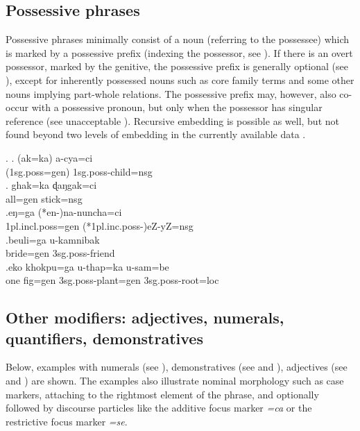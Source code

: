 \subsection{Possessive phrases}\label{str-np-poss}

Possessive phrases minimally consist  of a noun (referring to the possessee) which is marked by a possessive prefix (indexing the possessor, see \Next[a]). If there is an overt possessor, marked by the genitive, the possessive prefix is generally optional (see \Next[b]), except for inherently possessed nouns such as core family terms and some other nouns implying part-whole relations. The possessive prefix may, however, also  co-occur with a possessive pronoun, but only when the possessor has singular reference (see unacceptable \Next[c]). Recursive embedding is possible as well, but not found beyond two levels of embedding in the currently available data \Next[e].

\ex. \ag. (ak=ka)        a-cya=ci\\
({\sc 1sg.poss=gen}) {\sc 1sg.poss-}child{\sc =nsg}\\
 
\bg. ghak=ka    ɖaŋgak=ci\\
all{\sc =gen} stick{\sc =nsg}\\
 
\bg.eŋ=ga              (*en-)na-nuncha=ci\\
{\sc 1pl.incl.poss=gen} (*{\sc 1pl.inc.poss-})eZ-yZ{\sc =nsg}\\
 
\bg.beuli=ga    u-kamnibak\\ 
bride{\sc =gen} {\sc 3sg.poss-}friend\\
\bg.eko khokpu=ga      u-thap=ka              u-sam=be\\
one fig{\sc =gen} {\sc 3sg.poss-}plant{\sc =gen} {\sc 3sg.poss-}root{\sc =loc}\\
 

\subsection{Other modifiers: adjectives, numerals, quantifiers, demonstratives}\label{str-np-mod}

Below, examples with numerals (see \Next[a]), demonstratives (see \Next[b] and \Next[c]), adjectives (see \Next[d] and \Next[e]) are shown. The examples also illustrate nominal morphology such as case markers, attaching to the rightmost element of the phrase, and optionally followed by discourse particles like the additive focus marker \emph{=ca} or the restrictive focus marker \emph{=se}.


